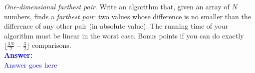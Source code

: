 \item{}
\emph{One-dimensional farthest pair}\/. Write an algorithm that, given an array
of $N$ numbers, finds a \emph{farthest pair}\/: two values whose difference is
no smaller than the difference of any other pair (in absolute value). The
running time of your algorithm must be linear in the worst case. Bonus points if
you can do exactly $\lfloor\frac{3N}{2}-\frac{3}{2}\rfloor$ comparisons.\\[12pt]
\ifanswers
\textcolor{blue}{
\textbf{Answer:}\\[6pt]
Answer goes here
}
\newpage
\fi
